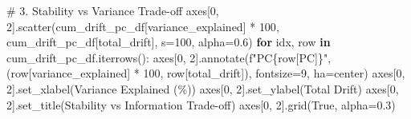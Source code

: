 \documentclass[
  letterpaper,
  DIV=11,
  numbers=noendperiod]{scrartcl}
\newenvironment{Shaded}{\begin{snugshade}}{\end{snugshade}}
\newcommand{\CommentTok}[1]{\textcolor[rgb]{0.37,0.37,0.37}{#1}}
\newcommand{\ControlFlowTok}[1]{\textcolor[rgb]{0.00,0.23,0.31}{\textbf{#1}}}
\newcommand{\DecValTok}[1]{\textcolor[rgb]{0.68,0.00,0.00}{#1}}
\newcommand{\FloatTok}[1]{\textcolor[rgb]{0.68,0.00,0.00}{#1}}
\newcommand{\KeywordTok}[1]{\textcolor[rgb]{0.00,0.23,0.31}{\textbf{#1}}}
\newcommand{\NormalTok}[1]{\textcolor[rgb]{0.00,0.23,0.31}{#1}}
\newcommand{\OperatorTok}[1]{\textcolor[rgb]{0.37,0.37,0.37}{#1}}
\newcommand{\SpecialCharTok}[1]{\textcolor[rgb]{0.37,0.37,0.37}{#1}}
\newcommand{\SpecialStringTok}[1]{\textcolor[rgb]{0.13,0.47,0.30}{#1}}
\newcommand{\StringTok}[1]{\textcolor[rgb]{0.13,0.47,0.30}{#1}}
\newcommand{\VariableTok}[1]{\textcolor[rgb]{0.07,0.07,0.07}{#1}}
\renewenvironment{Shaded}{%
  \begin{tcolorbox}[%
    enhanced,%
    colback=codebg,%
    colframe=codebg,%
    borderline west={3pt}{0pt}{sectionblue},%
    fontupper=\small\ttfamily,%
    boxrule=0pt,%
    arc=0pt,%
    boxsep=5pt,%
    left=2mm,%
    right=2mm,%
    top=2mm,%
    bottom=2mm%
  ]%
}{%
  \end{tcolorbox}%
}
\begin{document}
\begin{Shaded}
\begin{Highlighting}[]
\CommentTok{\# 3. Stability vs Variance Trade{-}off}
\NormalTok{axes[}\DecValTok{0}\NormalTok{, }\DecValTok{2}\NormalTok{].scatter(cum\_drift\_pc\_df[}\StringTok{\textquotesingle{}variance\_explained\textquotesingle{}}\NormalTok{] }\OperatorTok{*} \DecValTok{100}\NormalTok{, }
\NormalTok{                   cum\_drift\_pc\_df[}\StringTok{\textquotesingle{}total\_drift\textquotesingle{}}\NormalTok{], s}\OperatorTok{=}\DecValTok{100}\NormalTok{, alpha}\OperatorTok{=}\FloatTok{0.6}\NormalTok{)}
\ControlFlowTok{for}\NormalTok{ idx, row }\KeywordTok{in}\NormalTok{ cum\_drift\_pc\_df.iterrows():}
\NormalTok{    axes[}\DecValTok{0}\NormalTok{, }\DecValTok{2}\NormalTok{].annotate(}\SpecialStringTok{f"PC}\SpecialCharTok{\{}\NormalTok{row[}\StringTok{\textquotesingle{}PC\textquotesingle{}}\NormalTok{]}\SpecialCharTok{\}}\SpecialStringTok{"}\NormalTok{, }
\NormalTok{                       (row[}\StringTok{\textquotesingle{}variance\_explained\textquotesingle{}}\NormalTok{] }\OperatorTok{*} \DecValTok{100}\NormalTok{, row[}\StringTok{\textquotesingle{}total\_drift\textquotesingle{}}\NormalTok{]),}
\NormalTok{                       fontsize}\OperatorTok{=}\DecValTok{9}\NormalTok{, ha}\OperatorTok{=}\StringTok{\textquotesingle{}center\textquotesingle{}}\NormalTok{)}
\NormalTok{axes[}\DecValTok{0}\NormalTok{, }\DecValTok{2}\NormalTok{].set\_xlabel(}\StringTok{\textquotesingle{}Variance Explained (\%)\textquotesingle{}}\NormalTok{)}
\NormalTok{axes[}\DecValTok{0}\NormalTok{, }\DecValTok{2}\NormalTok{].set\_ylabel(}\StringTok{\textquotesingle{}Total Drift\textquotesingle{}}\NormalTok{)}
\NormalTok{axes[}\DecValTok{0}\NormalTok{, }\DecValTok{2}\NormalTok{].set\_title(}\StringTok{\textquotesingle{}Stability vs Information Trade{-}off\textquotesingle{}}\NormalTok{)}
\NormalTok{axes[}\DecValTok{0}\NormalTok{, }\DecValTok{2}\NormalTok{].grid(}\VariableTok{True}\NormalTok{, alpha}\OperatorTok{=}\FloatTok{0.3}\NormalTok{)}


\end{Highlighting}
\end{Shaded}
\end{document}
